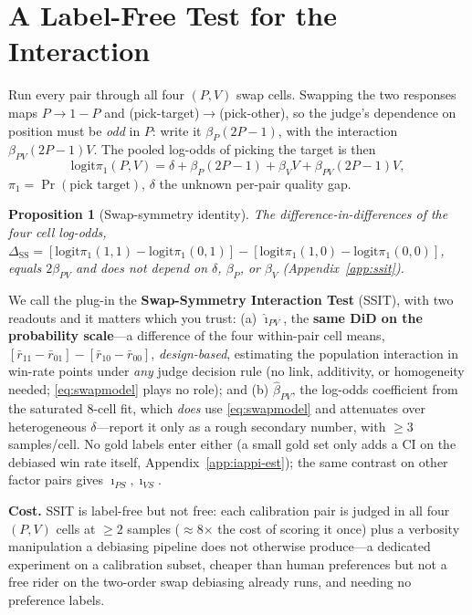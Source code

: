 \documentclass{article}
\newtheorem{proposition}{Proposition}
\newcommand{\logit}{\mathrm{logit}}
\begin{document}
\section{A Label-Free Test for the Interaction}
\label{sec:ssit}

Run every pair through all four $(P,V)$ swap cells. Swapping the two
responses maps $P\!\to\!1{-}P$ and (pick-target)$\to$(pick-other),
so the judge's dependence on position must be \emph{odd} in $P$:
write it $\beta_P(2P{-}1)$, with the interaction $\beta_{PV}(2P{-}1)V$.
The pooled log-odds of picking the target is then
\begin{equation}
  \logit\pi_1(P,V)=\delta+\beta_P(2P{-}1)+\beta_V V
    +\beta_{PV}(2P{-}1)V,
  \label{eq:swapmodel}
\end{equation}
$\pi_1{=}\Pr(\text{pick target})$, $\delta$ the unknown per-pair
quality gap.

\begin{proposition}[Swap-symmetry identity]
\label{prop:ssit}
The difference-in-differences of the four cell log-odds,
$\Delta_{\mathrm{SS}}=
[\logit\pi_1(1,1)-\logit\pi_1(0,1)]
-[\logit\pi_1(1,0)-\logit\pi_1(0,0)]$,
equals $2\beta_{PV}$ and does not depend on $\delta$, $\beta_P$, or
$\beta_V$ (Appendix~\ref{app:ssit}).
\end{proposition}

We call the plug-in the \textbf{Swap-Symmetry Interaction Test}
(SSIT), with two readouts and it matters which you trust: (a)
$\hat\imath_{PV}$, the \textbf{same DiD on the probability
scale}---a difference of the four within-pair cell means,
$[\bar r_{11}-\bar r_{01}]-[\bar r_{10}-\bar r_{00}]$,
\emph{design-based}, estimating the population interaction in
win-rate points under \emph{any} judge decision rule (no link,
additivity, or homogeneity needed; \eqref{eq:swapmodel} plays no
role); and (b) $\hat\beta_{PV}$, the log-odds coefficient from the
saturated 8-cell fit, which \emph{does} use \eqref{eq:swapmodel} and
attenuates over heterogeneous $\delta$---report it only as a rough
secondary number, with $\geq3$ samples/cell. No gold labels enter
either (a small gold set only adds a CI on the debiased win rate
itself, Appendix~\ref{app:iappi-est}); the same contrast on other
factor pairs gives $\imath_{PS},\imath_{VS}$.

\textbf{Cost.} SSIT is label-free but not free: each calibration pair
is judged in all four $(P,V)$ cells at $\geq2$ samples
($\approx$8$\times$ the cost of scoring it once) plus a verbosity
manipulation a debiasing pipeline does not otherwise produce---a
dedicated experiment on a calibration subset, cheaper than human
preferences but not a free rider on the two-order swap debiasing
already runs, and needing no preference labels.
\end{document}
